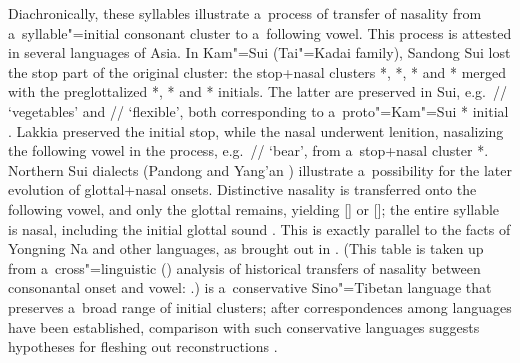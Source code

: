 			Diachronically, these syllables illustrate a~process of transfer of nasality from
			a~syllable"=initial consonant cluster to a~following vowel. This process is attested in several
			languages of Asia. In Kam"=Sui (Tai"=Kadai family), Sandong Sui lost the stop part of the original
			cluster: the stop+nasal clusters *, *, * and * merged with the
			preglottalized *, * and * initials. The latter are preserved in Sui,
			e.g.~// ‘vegetables’ and // ‘flexible’, both corresponding to a~proto"=Kam"=Sui *
			initial \citep[251--252]{ferlus1996c}. Lakkia preserved the initial stop, while the nasal underwent
			lenition, nasalizing the following vowel in the process, e.g.~// ‘bear’, from a~stop+nasal cluster *. Northern Sui dialects (Pandong 
			and Yang’an ) illustrate a~possibility for the later evolution of glottal+nasal onsets. Distinctive nasality is transferred onto the following vowel, and only the glottal remains, yielding
			[] or []; the entire syllable is nasal, including the initial glottal sound
			\citep[176]{haudricourt1967}. This is exactly parallel to the facts of Yongning Na and other 
			languages, as brought out in
			. (This table is taken up from
			a~cross"=linguistic () analysis of historical transfers of nasality between consonantal
			onset and vowel: \citet{michaudetal2012b}.)  is a~{conservative} Sino"=Tibetan language that preserves a~broad range of initial clusters; after correspondences among  languages have been established, comparison with such {conservative} languages suggests hypotheses for fleshing out reconstructions \citep[470-471]{jacquesetal2011}.
			
